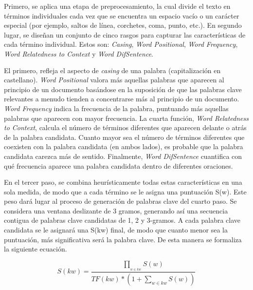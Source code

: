 \vspace{0.3cm}

Primero, se aplica una etapa de preprocesamiento, la cual divide el texto en términos individuales cada vez que se encuentra un espacio vacío o un carácter especial (por ejemplo, saltos de línea, corchetes, coma, punto, etc.). En segundo lugar, se diseñan un conjunto de cinco rasgos para capturar las características de cada término individual. Estos son: \textit{Casing}, \textit{Word Positional}, \textit{Word Frequency}, \textit{Word Relatedness to Context} y \textit{Word DifSentence}.

\vspace{0.3cm}

El primero, refleja el aspecto de \textit{casing} de una palabra (capitalización en castellano). \textit{Word Positional} valora más aquellas palabras que aparecen al principio de un documento basándose en la suposición de que las palabras clave relevantes a menudo tienden a concentrarse más al principio de un documento. \textit{Word Frequency} indica la frecuencia de la palabra, puntuando más aquellas palabras que aparecen con mayor frecuencia. La cuarta función, \textit{Word Relatedness to Context}, calcula el número de términos diferentes que aparecen delante o atrás de la palabra candidata. Cuanto mayor sea el número de términos diferentes que coexisten con la palabra candidata (en ambos lados), es probable que la palabra candidata carezca más de sentido. Finalmente, \textit{Word DifSentence} cuantifica con qué frecuencia aparece una palabra candidata dentro de diferentes oraciones.

\vspace{0.3cm}

En el tercer paso, se combina heurísticamente todas estas características en una sola medida, de modo que a cada término se le asigna una puntuación S(w). Este peso dará lugar al proceso de generación de palabras clave del cuarto paso. Se considera una ventana deslizante de 3 gramos, generando así una secuencia contigua de palabras clave candidatas de 1, 2 y 3-gramos. A cada palabra clave candidata se le asignará una S(kw) final, de modo que cuanto menor sea la puntuación, más significativa será la palabra clave. De esta manera se formaliza la siguiente ecuación.

\begin{equation}
S(kw)=\frac{\prod_{_{w \in kw}}^{}S(w)}{TF(kw)*(1+\sum_{w \in kw}^{}S(w))}
\end{equation}

